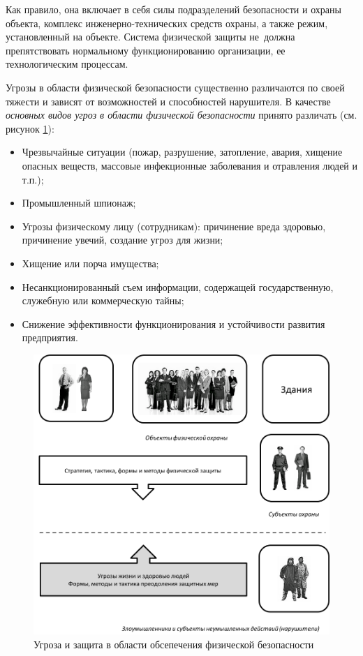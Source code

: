\documentclass[a4paper,12pt,fleqn]{article} %
\begin{document}
Как правило, она включает в себя силы подразделений безопасности и охраны объекта, комплекс инженерно-технических средств охраны, а также режим, установленный на объекте. Система физической защиты не~должна препятствовать нормальному функционированию организации, ее технологическим процессам.

Угрозы в области физической безопасности существенно различаются по своей тяжести и зависят от возможностей и способностей нарушителя. В качестве \textit{основных видов угроз в области физической безопасности} принято различать  (см. рисунок \ref{image1}): 

\begin{itemize}
	\item Чрезвычайные ситуации (пожар, разрушение, затопление, авария, хищение опасных веществ, массовые инфекционные заболевания и отравления людей и т.п.);
	\item Промышленный шпионаж;
	\item Угрозы физическому лицу (сотрудникам): причинение вреда здоровью, причинение увечий, создание угроз для жизни;
	\item Хищение или порча имущества;
	\item Несанкционированный съем информации, содержащей государственную, служебную или коммерческую тайны;
	\item Снижение эффективности функционирования и устойчивости развития предприятия.
\end{itemize}

\begin{figure}
	\centering
	\includegraphics[scale=0.7]{img1}
	\caption{Угроза и защита в области обсепечения физической безопасности}
	\label{image1}
\end{figure}
\end{document}
